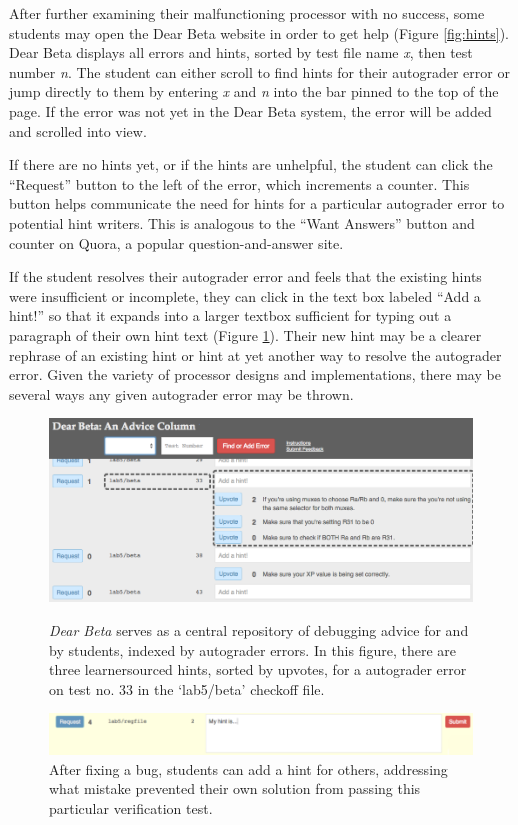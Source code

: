 After further examining their malfunctioning processor with no success, some students may open the Dear Beta website in order to get help (Figure \ref{fig:hints}). Dear Beta displays all errors and hints, sorted by test file name {\it x}, then test number {\it n}. The student can either scroll to find hints for their autograder error or jump directly to them by entering {\it x} and {\it n} into the bar pinned to the top of the page. If the error was not yet in the Dear Beta system, the error will be added and scrolled into view. 

If there are no hints yet, or if the hints are unhelpful, the student can click the ``Request'' button to the left of the error, which increments a counter. This button helps communicate the need for hints for a particular autograder error to potential hint writers. This is analogous to the ``Want Answers'' button and counter on Quora, a popular question-and-answer site. 

If the student resolves their autograder error and feels that the existing hints were insufficient or incomplete, they can click in the text box labeled ``Add a hint!'' so that it expands into a larger textbox sufficient for typing out a paragraph of their own hint text (Figure \ref{fig:contrib}). Their new hint may be a clearer rephrase of an existing hint or hint at yet another way to resolve the autograder error. Given the variety of processor designs and implementations, there may be several ways any given autograder error may be thrown. 

\begin{figure}
\centering
\includegraphics[width=1.0\columnwidth]{Body/figures/classoverflow/hints_modified.png}
\caption{{\it Dear Beta} serves as a central repository of debugging advice for and by students, indexed by autograder errors. In this figure, there are three learnersourced hints, sorted by upvotes, for a autograder error on test no. 33 in the `lab5/beta' checkoff file.}
\label{fig:hints}

\bigskip
\centering
\includegraphics[width=1.0\columnwidth]{Body/figures/classoverflow/contrib_shortened.png}
\caption{After fixing a bug, students can add a hint for others, addressing what mistake prevented their own solution from passing this particular verification test.}
\label{fig:contrib}
\end{figure}

